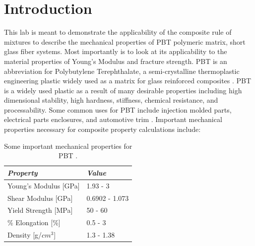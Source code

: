 \documentclass[11pt]{article}
\begin{document}
\tableofcontents
\newpage
\listoffigures
\newpage
\listoftables
\newpage

\section{Introduction}
This lab is meant to demonstrate the applicability of the composite rule of mixtures to describe the mechanical properties of PBT polymeric matrix, short glass fiber systems. Most importantly is to look at its applicability to the material properties of Young's Modulus and fracture strength. PBT is an abbreviation for Polybutylene Terephthalate, a semi-crystalline thermoplastic engineering plastic widely used as a matrix for glass reinforced composites \cite{pbt}. PBT is a widely used plastic as a result of many desirable properties including high dimensional stability, high hardness, stiffness, chemical resistance, and processability. Some common uses for PBT include injection molded parts, electrical parts enclosures, and automotive trim \cite{pbt}. Important mechanical properties necessary for composite property calculations include:

\begin{table}[htb!]
\caption{Some important mechanical properties for PBT \cite{PBTmechProperties}.}
\label{mechProperties}
\begin{center}
\begin{tabular}{ p{6cm} || p{2cm}}
\textit{\textbf{Property}}& \textit{\textbf{Value}}\\
\hline

Young's Modulus [GPa] &  
\begin{minipage}[t]{1\textwidth}
	1.93 - 3
\end{minipage}\\

Shear Modulus [GPa] &  
\begin{minipage}[t]{1\textwidth}
	0.6902 - 1.073
\end{minipage}\\

Yield Strength [MPa] &  
\begin{minipage}[t]{1\textwidth}
	50 - 60
\end{minipage}\\ 

\% Elongation [\%] &  
\begin{minipage}[t]{1\textwidth}
	0.5 - 3
\end{minipage}\\ 

Density [g/\(cm^3\)] &  
\begin{minipage}[t]{1\textwidth}
	1.3 - 1.38
\end{minipage}\\ 

\end{tabular}
\end{center}
\end{table}
\end{document}
